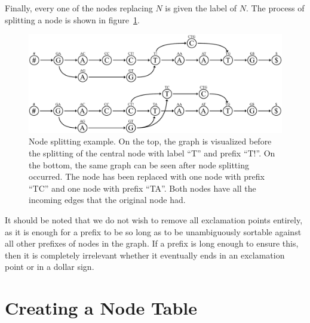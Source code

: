 \documentclass[a4paper,12pt,twoside,BCOR=10mm]{scrbook}
\begin{document}
Finally, every one of the nodes replacing $ N $ is given the label of $ N $. 
The process of splitting a node is shown in figure~\ref{fig:evo_fig_node_splitting}. \\
\begin{figure}[!htb]
\centering
\includegraphics[width=\textwidth]{evo_fig_node_splitting.pdf}
\caption[Node splitting example]{Node splitting example. On the top, the graph is visualized before the splitting of the central node with label “T” and prefix “T!”. On the bottom, the same graph can be seen after node splitting occurred. The node has been replaced with one node with prefix “TC” and one node with prefix “TA”. Both nodes have all the incoming edges that the original node had.} \label{fig:evo_fig_node_splitting}
\end{figure}
It should be noted that we do not wish to remove all exclamation points entirely, 
as it is enough for a prefix to be so long as to be unambiguously sortable against all 
other prefixes of nodes in the graph. If a prefix is long enough to ensure this, then 
it is completely irrelevant whether it eventually ends in an exclamation point or in a dollar sign.

\section{Creating a Node Table}
%
\end{document}
